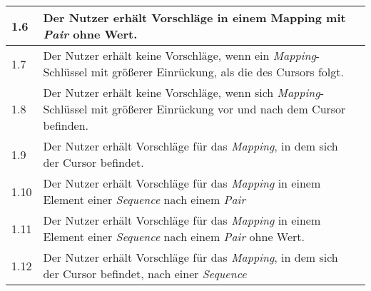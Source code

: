 \begin{table}[htp]
\begin{tabularx}{\columnwidth}{lXl}
    \midrule
    1.6                                                                   & Der Nutzer erhält Vorschläge in einem Mapping mit \textit{Pair} ohne Wert.                                                                                                                                                            &                                           \\
    \midrule
    1.7                                                                   & Der Nutzer erhält keine Vorschläge, wenn ein \textit{Mapping}-Schlüssel mit größerer Einrückung, als die des Cursors folgt.                                                                                                           &                                           \\
    \midrule
    1.8                                                                   & Der Nutzer erhält keine Vorschläge, wenn sich \textit{Mapping}-Schlüssel mit größerer Einrückung vor und nach dem Cursor befinden.                                                                                                    &                                           \\
    \midrule
    1.9                                                                   & Der Nutzer erhält Vorschläge für das \textit{Mapping}, in dem sich der Cursor befindet.                                                                                                                                               &                                           \\
    \midrule
    1.10                                                                  & Der Nutzer erhält Vorschläge für das \textit{Mapping} in einem Element einer \textit{Sequence} nach einem \textit{Pair}                                                                                                               &                                           \\
    \midrule
    1.11                                                                  & Der Nutzer erhält Vorschläge für das \textit{Mapping} in einem Element einer \textit{Sequence} nach einem \textit{Pair} ohne Wert.                                                                                                    &                                           \\
    \midrule
    1.12                                                                  & Der Nutzer erhält Vorschläge für das \textit{Mapping}, in dem sich der Cursor befindet, nach einer \textit{Sequence}                                                                                                                  &                                           \\

\end{tabularx}
\end{table}
